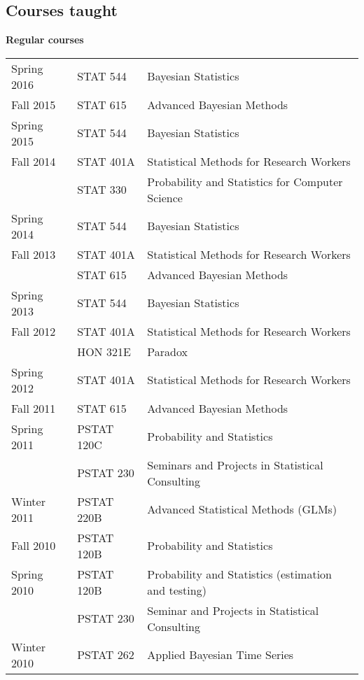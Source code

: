 \documentclass[overlapped,line]{res}
\begin{document}
\begin{resume}

\section{\bf Courses taught}
\vspace{0.1in}

{\bf Regular courses}

\begin{tabular}{lll}
Spring 2016 & STAT 544 & Bayesian Statistics \\
Fall 2015 & STAT 615 & Advanced Bayesian Methods \\
Spring 2015 & STAT 544 & Bayesian Statistics \\
Fall 2014 & STAT 401A & Statistical Methods for Research Workers \\
& STAT 330 & Probability and Statistics for Computer Science \\
Spring 2014 & STAT 544 & Bayesian Statistics \\
Fall 2013 & STAT 401A & Statistical Methods for Research Workers \\
& STAT 615 & Advanced Bayesian Methods \\
Spring 2013 & STAT 544 & Bayesian Statistics \\
Fall 2012 & STAT 401A & Statistical Methods for Research Workers \\
 & HON 321E & Paradox \\
Spring 2012 & STAT 401A & Statistical Methods for Research Workers \\
Fall 2011 & STAT 615 & Advanced Bayesian Methods \\
\hline
Spring 2011 & PSTAT 120C & Probability and Statistics \\ %
& PSTAT 230 & Seminars and Projects in Statistical Consulting \\
Winter 2011 & PSTAT 220B & Advanced Statistical Methods (GLMs) \\
Fall 2010  & PSTAT 120B & Probability and Statistics \\
Spring 2010 & PSTAT 120B & Probability and Statistics (estimation and testing) \\
 & PSTAT 230 & Seminar and Projects in Statistical Consulting \\
Winter 2010 & PSTAT 262 & Applied Bayesian Time Series
\end{tabular}


\end{resume}
\end{document}
